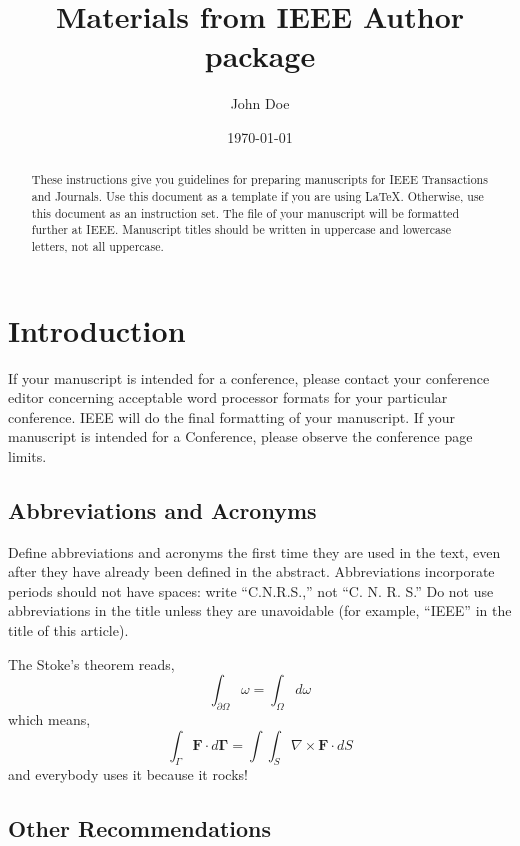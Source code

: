 \documentclass[11pt]{article}
\author{John Doe}
\date{\today}
\title{Materials from IEEE Author package}
\begin{document}
\maketitle

\begin{abstract}
These instructions give you guidelines for preparing manuscripts for
IEEE Transactions and Journals. Use this document as a template if you are
using \LaTeX. Otherwise, use this document as an
instruction set. The file of your manuscript will be formatted further
at IEEE. Manuscript titles should be written in uppercase and lowercase letters,
not all uppercase.
\end{abstract}


\section{Introduction}
\label{sec:introduction}

If your manuscript is intended for a conference, please contact your
conference editor concerning acceptable word processor formats for your
particular conference. IEEE will do the final formatting of your
manuscript. If your manuscript is intended for a Conference, please observe the
conference page limits.


\subsection{Abbreviations and Acronyms}
\label{sec:abrev}

Define abbreviations and acronyms the first time they are used in the text,
even after they have already been defined in the abstract. Abbreviations
incorporate periods should not have spaces: write ``C.N.R.S.,'' not ``C. N.
R. S.'' Do not use abbreviations in the title unless they are unavoidable
(for example, ``IEEE'' in the title of this article).

The Stoke's theorem reads,
\begin{equation}
  \label{eq:beautiful}
  \int_{\partial\Omega} \omega = \int_\Omega d\omega
\end{equation}
which means,
\begin{equation}
  \label{sec:ugly}
  \int_\Gamma \mathbf{F}\cdot d\mathbf{\Gamma}
  =
  \int\int_S \nabla\times\mathbf{F}\cdot dS
\end{equation}
and everybody uses it because it rocks!


\subsection{Other Recommendations}
\label{sec:reco}
\end{document}
